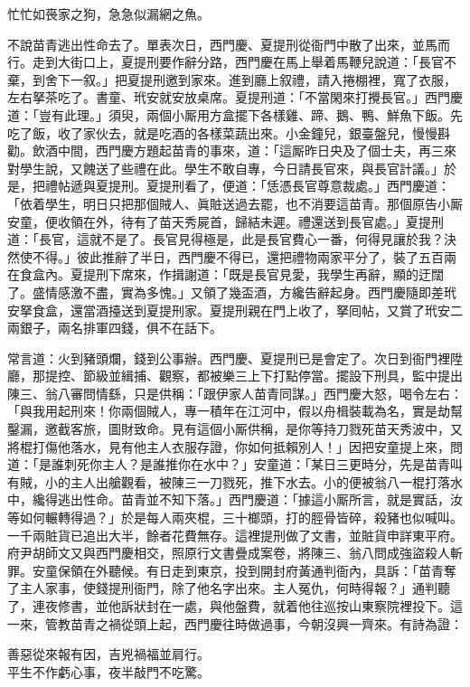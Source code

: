 \begin{myquote}
忙忙如䘮家之狗，急急似漏網之魚。
\end{myquote}

不說苗青逃出性命去了。單表次日，西門慶、夏提刑從衙門中散了出來，並馬而行。走到大街口上，夏提刑要作辭分路，西門慶在馬上舉着馬鞭兒說道：「長官不棄，到舍下一叙。」把夏提刑邀到家來。進到廳上叙禮，請入捲棚裡，寬了衣服，左右拏茶吃了。書童、玳安就安放桌席。夏提刑道：「不當閑來打攪長官。」西門慶道：「豈有此理。」須臾，兩個小厮用方盒擺下各樣雞、蹄、鵝、鴨、鮮魚下飯。先吃了飯，收了家伙去，就是吃酒的各樣菜蔬出來。小金鐘兒，銀臺盤兒，慢慢斟勸。飲酒中間，西門慶方題起苗青的事來，道：「這厮昨日央及了個士夫，再三來對學生說，又餽送了些禮在此。學生不敢自專，今日請長官來，與長官計議。」於是，把禮帖遞與夏提刑。夏提刑看了，便道：「恁憑長官尊意裁處。」西門慶道：「依着學生，明日只把那個賊人、眞賍送過去罷，也不消要這苗青。那個原告小厮安童，便收領在外，待有了苗天秀屍首，歸結未遲。禮還送到長官處。」夏提刑道：「長官，這就不是了。長官見得極是，此是長官費心一番，何得見讓於我？決然使不得。」彼此推辭了半日，西門慶不得已，還把禮物兩家平分了，裝了五百兩在食盒內。夏提刑下席來，作揖謝道：「既是長官見愛，我學生再辭，顯的迂闊了。盛情感激不盡，實為多愧。」又領了幾盃酒，方纔告辭起身。西門慶隨即差玳安拏食盒，還當酒擡送到夏提刑家。夏提刑親在門上收了，拏囘帖，又賞了玳安二兩銀子，兩名排軍四錢，俱不在話下。

常言道：火到豬頭爛，錢到公事辦。西門慶、夏提刑已是會定了。次日到衙門裡陞廳，那提控、節級並緝捕、觀察，都被樂三上下打點停當。擺設下刑具，監中提出陳三、翁八審問情繇，只是供稱：「跟伊家人苗青同謀。」西門慶大怒，喝令左右：「與我用起刑來！你兩個賊人，專一積年在江河中，假以舟楫裝載為名，實是劫幫鑿漏，邀截客旅，圖財致命。見有這個小厮供稱，是你等持刀戮死苗天秀波中，又將棍打傷他落水，見有他主人衣服存證，你如何抵賴別人！」因把安童提上來，問道：「是誰刺死你主人？是誰推你在水中？」安童道：「某日三更時分，先是苗青叫有賊，小的主人出艙觀看，被陳三一刀戮死，推下水去。小的便被翁八一棍打落水中，纔得逃出性命。苗青並不知下落。」西門慶道：「據這小厮所言，就是實話，汝等如何輾轉得過？」於是每人兩夾棍，三十榔頭，打的脛骨皆碎，殺豬也似喊叫。一千兩賍貨已追出大半，餘者花費無存。這裡提刑做了文書，並賍貨申詳東平府。府尹胡師文又與西門慶相交，照原行文書疊成案卷，將陳三、翁八問成強盜殺人斬罪。安童保領在外聽候。有日走到東京，投到開封府黃通判衙內，具訴：「苗青奪了主人家事，使錢提刑衙門，除了他名字出來。主人冤仇，何時得報？」通判聽了，連夜修書，並他訴狀封在一處，與他盤費，就着他往巡按山東察院裡投下。這一來，管教苗青之禍從頭上起，西門慶往時做過事，今朝沒興一齊來。有詩為證：

\begin{myquote}
善惡從來報有因，吉兇禍福並肩行。\\平生不作虧心事，夜半敲門不吃驚。
\end{myquote}

